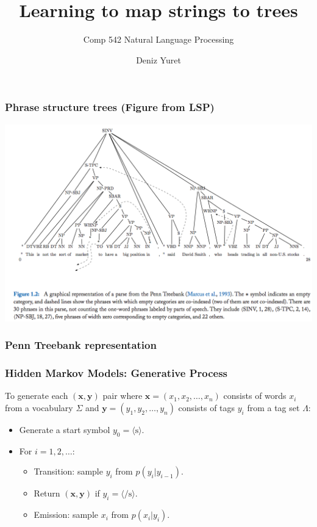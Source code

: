 \documentclass[ignorenonframetext,plain,fleqn]{beamer}
\title{Learning to map strings to trees}
\subtitle{Comp 542 Natural Language Processing}
\author{Deniz Yuret}
\renewcommand{\vec}{\mathbf}
\newcommand{\sos}{\mbox{$\langle$s$\rangle$}}
\newcommand{\eos}{\mbox{$\langle/$s$\rangle$}}
\begin{document}
\begin{frame}
\maketitle
\end{frame}


\begin{frame}\frametitle{Phrase structure trees (Figure from LSP)}
\includegraphics[width=\textwidth]{images/smith-fig-1-2.png}
\end{frame}

\begin{frame}[fragile]\frametitle{Penn Treebank representation}
\begin{tiny}

\end{tiny}
\end{frame}

\begin{frame}\frametitle{Hidden Markov Models: Generative Process}
To generate each $(\vec{x},\vec{y})$ pair where $\vec{x} = (x_1, x_2,
\dots, x_n)$ consists of words $x_i$ from a vocabulary $\Sigma$ and
$\vec{y} = (y_1, y_2, \dots, y_n)$ consists of tags $y_i$ from a tag
set $\Lambda$:
\begin{itemize}
\item Generate a start symbol $y_0=\sos$.
\item For $i=1, 2, \dots$:
\begin{itemize}
\item Transition: sample $y_i$ from $p(y_i|y_{i-1})$.
\item Return $(\vec{x}, \vec{y})$ if $y_i=\eos$.
\item Emission: sample $x_i$ from $p(x_i|y_i)$.
\end{itemize}
\end{itemize}
\end{frame}
\end{document}
